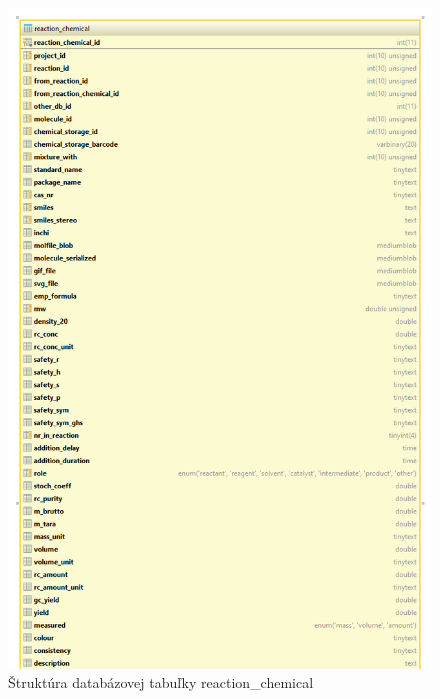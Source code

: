 \documentclass[thesis=M,slovak]{FITthesis}[2013/05/06]
\begin{document}
%

\begin{figure}\centering
	\includegraphics[width=1.0\textwidth]{Schema_DB_Open_Enventory/reaction_chemical_1.png}
 	\caption[Štruktúra databázovej tabuľky reaction\_chemical]{Štruktúra databázovej tabuľky reaction\_chemical}\label{graphics:reactionChemical1}
\end{figure}
\end{document}
